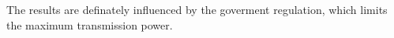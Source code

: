 The results are definately influenced by the goverment regulation, which limits the maximum transmission power.
